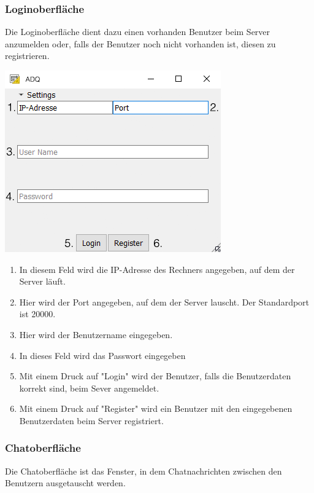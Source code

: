 \documentclass[12pt,a4paper,bibliography=totocnumbered,listof=totocnumbered]{scrartcl}
\begin{document}
\subsubsection{Loginoberfläche}
Die Loginoberfläche dient dazu einen vorhanden Benutzer beim Server anzumelden oder, falls der Benutzer noch nicht vorhanden ist, diesen zu registrieren.

\begin{minipage}{\linewidth}
	\centering
	\includegraphics[width=0.85\linewidth]{img/Client_Login.png}
	
\end{minipage}
\vspace{1em}
\begin{enumerate}
	\item In diesem Feld wird die IP-Adresse des Rechners angegeben, auf dem der Server läuft.
	\item Hier wird der Port angegeben, auf dem der Server lauscht. Der Standardport ist 20000. 
	\item Hier wird der Benutzername eingegeben.
	\item In dieses Feld wird das Passwort eingegeben
	\item Mit einem Druck auf "Login" wird der Benutzer, falls die Benutzerdaten korrekt sind, beim Sever angemeldet.
	\item Mit einem Druck auf "Register" wird ein Benutzer mit den eingegebenen Benutzerdaten beim Server registriert.
\end{enumerate}
\subsubsection{Chatoberfläche}
Die Chatoberfläche ist das Fenster, in dem Chatnachrichten zwischen den Benutzern ausgetauscht werden.
\end{document}
